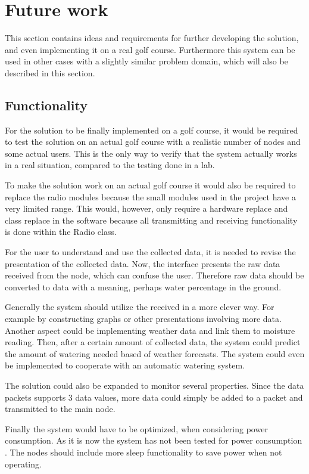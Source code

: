 \section{Future work}
This section contains ideas and requirements for further developing the solution, and even implementing it on a real golf course. Furthermore this system can be used in other cases with a slightly similar problem domain, which will also be described in this section.

\subsection{Functionality}
For the solution to be finally implemented on a golf course, it would be required to test the solution on an actual golf course with a realistic number of nodes and some actual users. This is the only way to verify that the system actually works in a real situation, compared to the testing done in a lab.

To make the solution work on an actual golf course it would also be required to replace the radio modules because the small modules used in the project have a very limited range. This would, however, only require a hardware replace and class replace in the software because all transmitting and receiving functionality is done within the Radio class.

For the user to understand and use the collected data, it is needed to revise the presentation of the collected data. Now, the interface presents the raw data received from the node, which can confuse the user. Therefore raw data should be converted to data with a meaning, perhaps water percentage in the ground.

Generally the system should utilize the received in a more clever way. For example by constructing graphs or  other presentations involving more data. Another aspect could be implementing weather data and link them to moisture reading. Then, after a certain amount of collected data, the system could predict the amount of watering needed based of weather forecasts. The system could even be implemented to cooperate with an automatic watering system.

The solution could also be expanded to monitor several properties. Since the data packets supports 3 data values, more data could simply be added to a packet and transmitted to the main node.

Finally the system would have to be optimized, when considering power consumption. As it is now the system has not been tested for power consumption . The nodes should include more sleep functionality to save power when not operating.

